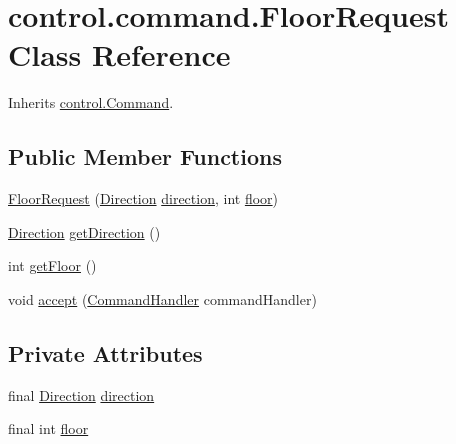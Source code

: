 \hypertarget{classcontrol_1_1command_1_1_floor_request}{}\section{control.\+command.\+Floor\+Request Class Reference}
\label{classcontrol_1_1command_1_1_floor_request}


Inherits \mbox{\hyperlink{interfacecontrol_1_1_command}{control.\+Command}}.

\subsection*{Public Member Functions}
\begin{DoxyCompactItemize}
\item 
\mbox{\hyperlink{classcontrol_1_1command_1_1_floor_request_a03685a59d9f54c5057713039fa580369}{Floor\+Request}} (\mbox{\hyperlink{enumcontrol_1_1command_1_1_direction}{Direction}} \mbox{\hyperlink{classcontrol_1_1command_1_1_floor_request_a0d1e1a3a816acba02789469f4e46a5d1}{direction}}, int \mbox{\hyperlink{classcontrol_1_1command_1_1_floor_request_a8cac00f900db9272c0e6971e0327075f}{floor}})
\item 
\mbox{\hyperlink{enumcontrol_1_1command_1_1_direction}{Direction}} \mbox{\hyperlink{classcontrol_1_1command_1_1_floor_request_ad0e7950407e9e15e4a3be8927f1e3408}{get\+Direction}} ()
\item 
int \mbox{\hyperlink{classcontrol_1_1command_1_1_floor_request_a752d0cf165ba8d1033b9d8ca6b4c4d3e}{get\+Floor}} ()
\item 
void \mbox{\hyperlink{classcontrol_1_1command_1_1_floor_request_a89db76c1649b41ee844fb79898ce4de2}{accept}} (\mbox{\hyperlink{interfacecontrol_1_1_command_handler}{Command\+Handler}} command\+Handler)
\end{DoxyCompactItemize}
\subsection*{Private Attributes}
\begin{DoxyCompactItemize}
\item 
final \mbox{\hyperlink{enumcontrol_1_1command_1_1_direction}{Direction}} \mbox{\hyperlink{classcontrol_1_1command_1_1_floor_request_a0d1e1a3a816acba02789469f4e46a5d1}{direction}}
\item 
final int \mbox{\hyperlink{classcontrol_1_1command_1_1_floor_request_a8cac00f900db9272c0e6971e0327075f}{floor}}
\end{DoxyCompactItemize}


